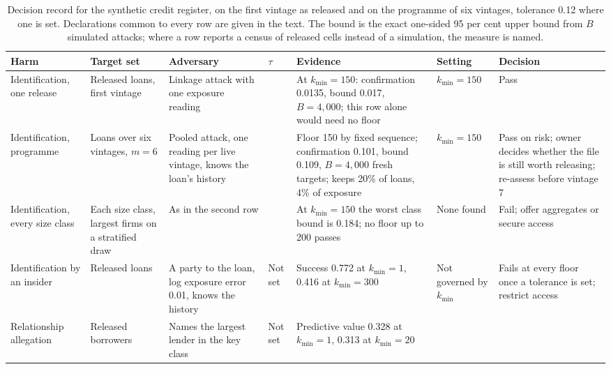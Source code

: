 \begin{table}[p]
\centering
\caption{Decision record for the synthetic credit register, on the first vintage as
released and on the programme of six vintages, tolerance 0.12 where one is set.
Declarations common to every row are given in the text. The bound is the exact
one-sided 95 per cent upper bound from $B$ simulated attacks; where a row reports a
census of released cells instead of a simulation, the measure is named.}
\label{c16:tab-record}
\footnotesize
\setlength{\tabcolsep}{3pt}
\begin{tabular}{@{}>{\raggedright\arraybackslash}p{1.9cm}>{\raggedright\arraybackslash}p{2.0cm}>{\raggedright\arraybackslash}p{2.4cm}>{\raggedright\arraybackslash}p{0.7cm}>{\raggedright\arraybackslash}p{2.6cm}>{\raggedright\arraybackslash}p{1.8cm}>{\raggedright\arraybackslash}p{2.2cm}@{}}
\toprule
Harm & Target set & Adversary & $\tau$ & Evidence & Setting & Decision \\
\midrule
Identification, one release & Released loans, first vintage & Linkage attack with
one exposure reading & 0.12 & At $k_{\min} = 150$: confirmation 0.0135, bound
0.017, $B = 4{,}000$; this row alone would need no floor & $k_{\min} = 150$ & Pass \\
\addlinespace
Identification, programme & Loans over six vintages, $m = 6$ & Pooled attack, one
reading per live vintage, knows the loan's history & 0.12 & Floor 150 by fixed
sequence; confirmation 0.101, bound 0.109, $B = 4{,}000$ fresh targets; keeps 20\%
of loans, 4\% of exposure & $k_{\min} = 150$ & Pass on risk; owner decides whether
the file is still worth releasing; re-assess before vintage 7 \\
\addlinespace
Identification, every size class & Each size class, largest firms on a stratified
draw & As in the second row & 0.12 & At $k_{\min} = 150$ the worst class bound is
0.184; no floor up to 200 passes & None found & Fail; offer aggregates or secure
access \\
\addlinespace
Identification by an insider & Released loans & A party to the loan, log exposure
error 0.01, knows the history & Not set & Success 0.772 at $k_{\min} = 1$, 0.416 at
$k_{\min} = 300$ & Not governed by $k_{\min}$ & Fails at every floor once a tolerance
is set; restrict access \\
\addlinespace
Relationship allegation & Released borrowers & Names the largest lender in the key
class & Not set & Predictive value 0.328 at $k_{\min} = 1$, 0.313 at $k_{\min} = 20$

\end{tabular}
\end{table}
